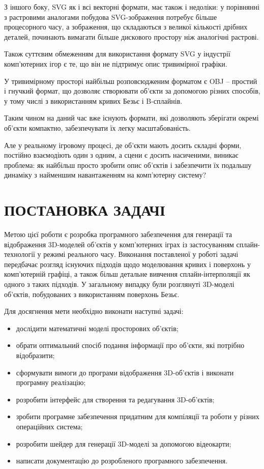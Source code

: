 \let\mypdfximage\pdfximage\def\pdfximage{\immediate\mypdfximage}\documentclass[14pt,a4paper]{extarticle}
\theoremstyle{definition}
\renewcommand{\[}{\begin{singlespace}\begin{equation*}}
\renewcommand{\]}{\end{equation*}\end{singlespace}}
\renewcommand{\+}{\discretionary{\mbox{\scriptsize$\hookleftarrow$}}{}{}}
\begin{document}
З іншого боку, SVG як і всі векторні формати, має також і недоліки: у порівнянні з растровими аналогами побудова SVG-зображення потребує більше процесорного часу, а зображення, що складаються з великої кількості дрібних деталей, починають вимагати більше дискового простору ніж аналогічні растрові. 

Також суттєвим обмеженням для використання формату SVG у індустрії комп'ютерних ігор є те, що він не підтримує опис тривимірної графіки.

У тривимірному просторі найбільш розповсюдженим форматом є OBJ – простий і гнучкий формат, що дозволяє створювати об'єкти за допомогою різних способів, у тому числі з використанням кривих Безьє і B-сплайнів.
 
Таким чином на даний час вже існують формати, які дозволяють зберігати окремі об'єкти компактно, забезпечувати їх легку масштабованість.

Але у реальному ігровому процесі, де об'єкти мають досить складні форми,  постійно взаємодіють один з одним, а сцени є досить насиченими, виникає проблема: як найбільш просто зробити опис об'єктів і забезпечити їх подальшу динаміку з найменшим навантаженням на комп'ютерну систему?

\section*{ПОСТАНОВКА ЗАДАЧІ}

Метою цієї роботи є розробка програмного забезпечення для генерації та відображення 3D-моделей об'єктів у комп'ютерних іграх із застосуванням  сплайн-технології у режимі реального часу. Виконання поставленої у роботі задачі передбачає розгляд існуючих підходів щодо моделювання кривих і поверхонь у комп'ютерній графіці, а також більш детальне вивчення сплайн-інтерполяції як одного з таких підходів. У загальному випадку були розглянуті 3D-моделі об'єктів, побудованих з використанням поверхонь Безьє.

Для досягнення мети необхідно виконати наступні задачі:

\begin{itemize}
\item дослідити математичні моделі просторових об'єктів;
\item обрати оптимальний спосіб подання інформації про об'єкти, які потрібно відобразити;
\item сформувати вимоги до програми відображення 3D-об'єктів і виконати програмну реалізацію;
\item розробити інтерфейс для створення та редагування 3D-об'єктів;
\item зробити програмне забезпечення придатним для компіляції та роботи у різних операційних система;
\item розробити шейдер для генерації 3D-моделі за допомогою відеокарти;
\item написати документацію до розробленого програмного забезпечення.
\end{itemize}
\end{document}
